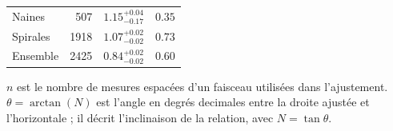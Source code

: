 \begin{table}[p]
\begin{tabular*}{0.76\textwidth}{@{\extracolsep{\fill}}lrrr@{}}
Naines & 507 & $1.15^{+0.04}_{-0.17}$ & $0.35$ \\
Spirales & 1918 & $1.07^{+0.02}_{-0.02}$ & $0.73$ \\
Ensemble & 2425 & $0.84^{+0.02}_{-0.02}$ & $0.60$ \\
\bottomrule
\end{tabular*}
\par\vspace{5pt}
\footnotesize\raggedright
$n$ est le nombre de mesures espacées d'un faisceau utilisées dans l'ajustement.\\
$\theta = \arctan(N)$ est l'angle en degr\'es decimales entre la droite ajustée et l'horizontale ; il décrit l'inclinaison de la relation, avec $N=\tan\theta$.
\par
\endgroup
\end{table}
